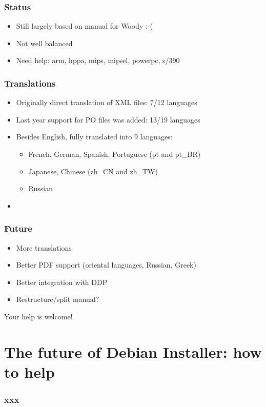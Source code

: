 \documentclass{beamer}
\begin{document}
\begin{frame}
  \frametitle{Status}
	\begin{itemize}
	\item
		Still largely based on manual for Woody :-(
	\item
		Not well balanced
	\item
		Need help: arm, hppa, mips, mipsel, powerpc, s/390
	\end{itemize}
\end{frame}

\begin{frame}
  \frametitle{Translations}
	\begin{itemize}
	\item
		Originally direct translation of XML files: 7/12 languages
	\item
		Last year support for PO files was added: 13/19 languages
	\item
		Besides English, fully translated into 9 languages:
		\begin{itemize}
		\item
			French, German, Spanish, Portuguese (pt and pt\_BR)
		\item
			Japanese, Chinese (zh\_CN and zh\_TW)
		\item
			Russian
		\end{itemize}
	\item
		
	\end{itemize}
\end{frame}

\begin{frame}
  \frametitle{Future}
	\begin{itemize}
	\item
		More translations
	\item
		Better PDF support (oriental languages, Russian, Greek)
	\item
		Better integration with DDP
	\item
		Restructure/split manual?
	\end{itemize}
	
	Your help is welcome!
\end{frame}


\section{The future of Debian Installer: how to help}

\begin{frame}
  \frametitle{xxx}
\end{frame}
\end{document}
